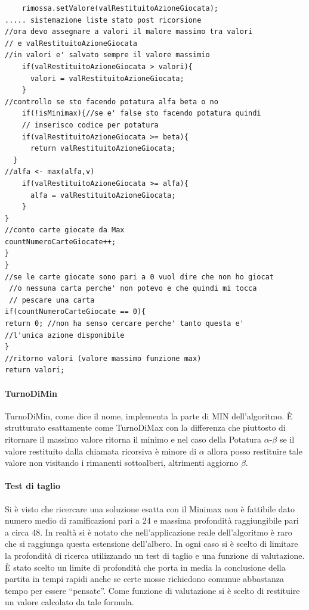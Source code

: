 \begin{lstlisting}
    rimossa.setValore(valRestituitoAzioneGiocata);
..... sistemazione liste stato post ricorsione
//ora devo assegnare a valori il malore massimo tra valori
// e valRestituitoAzioneGiocata
//in valori e' salvato sempre il valore massimio
    if(valRestituitoAzioneGiocata > valori){
      valori = valRestituitoAzioneGiocata;
    }
//controllo se sto facendo potatura alfa beta o no
    if(!isMinimax){//se e' false sto facendo potatura quindi
    // inserisco codice per potatura
    if(valRestituitoAzioneGiocata >= beta){
      return valRestituitoAzioneGiocata;
  }
//alfa <- max(alfa,v)
    if(valRestituitoAzioneGiocata >= alfa){
      alfa = valRestituitoAzioneGiocata;
    }
}
//conto carte giocate da Max
countNumeroCarteGiocate++;
}
}
//se le carte giocate sono pari a 0 vuol dire che non ho giocat
 //o nessuna carta perche' non potevo e che quindi mi tocca
 // pescare una carta
if(countNumeroCarteGiocate == 0){
return 0; //non ha senso cercare perche' tanto questa e' 
//l'unica azione disponibile
}
//ritorno valori (valore massimo funzione max)
return valori;	
\end{lstlisting}
	
		\paragraph{TurnoDiMin}
		TurnoDiMin, come dice il nome, implementa la parte di MIN dell'algoritmo. È strutturato esattamente come TurnoDiMax con la differenza che piuttosto di ritornare il massimo valore ritorna il minimo e nel caso della Potatura $\alpha$-$\beta$ se il valore restituito dalla chiamata ricorsiva è minore di $\alpha$ allora posso restituire tale valore non visitando i rimanenti sottoalberi, altrimenti aggiorno $\beta$.
		
		\paragraph{Test di taglio}
		Si è visto che ricercare una soluzione esatta con il Minimax non è fattibile dato numero medio di ramificazioni pari a 24 e massima profondità raggiungibile pari a circa 48. In realtà si è notato che nell'applicazione reale dell'algoritmo è raro che si raggiunga questa estensione dell'albero. In ogni caso si è scelto di limitare la profondità di ricerca utilizzando un test di taglio e una funzione di valutazione. È stato scelto un limite di profondità che porta in media la conclusione della partita in tempi rapidi anche se certe mosse richiedono comunue abbastanza tempo per essere ``pensate''. Come funzione di valutazione si è scelto di restituire un valore calcolato da tale formula.\\\\
		
